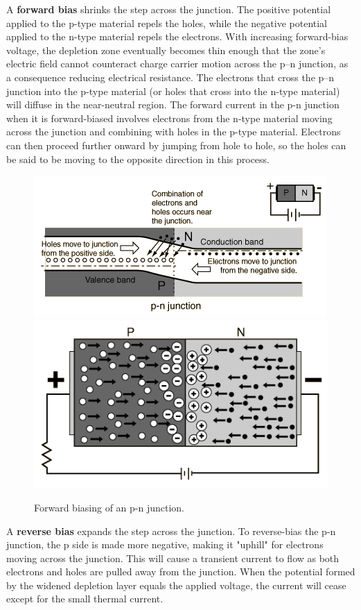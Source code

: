 \documentclass[main]{subfiles}
\begin{document}
A \textbf{forward bias} shrinks the step across the junction. The positive potential applied to the p-type material repels the holes, while the negative potential applied to the n-type material repels the electrons. With increasing forward-bias voltage, the depletion zone eventually becomes thin enough that the zone's electric field cannot counteract charge carrier motion across the p–n junction, as a consequence reducing electrical resistance. The electrons that cross the p–n junction into the p-type material (or holes that cross into the n-type material) will diffuse in the near-neutral region. The forward current in the p-n junction when it is forward-biased involves electrons from the n-type material moving across the junction and combining with holes in the p-type material. Electrons can then proceed further onward by jumping from hole to hole, so the holes can be said to be moving to the opposite direction in this process.

\begin{figure}[H]
\centering
\includegraphics[scale=0.8]{figs/forward_bias.png}
\includegraphics[scale=0.8]{figs/forward_bias2.png}
\caption{Forward biasing of an p-n junction.}
\end{figure}

A \textbf{reverse bias} expands the step across the junction. To reverse-bias the p-n junction, the p side is made more negative, making it "uphill" for electrons moving across the junction. This will cause a transient current to flow as both electrons and holes are pulled away from the junction. When the potential formed by the widened depletion layer equals the applied voltage, the current will cease except for the small thermal current.
\end{document}
